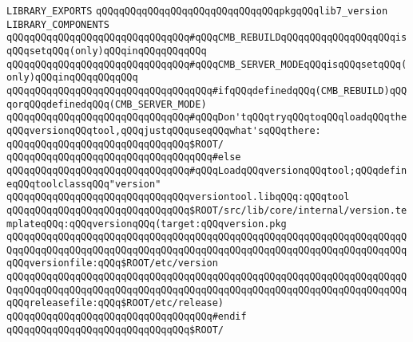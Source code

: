 \verb|LIBRARY_EXPORTS|\newline
\newline
\verb|qQQqqQQqqQQqqQQqqQQqqQQqqQQqqQQqpkgqQQqlib7_version|\newline
\newline
\newline
\newline
\verb|LIBRARY_COMPONENTS|\newline
\newline
\verb|qQQqqQQqqQQqqQQqqQQqqQQqqQQqqQQq#qQQqCMB_REBUILDqQQqqQQqqQQqqQQqqQQqisqQQqsetqQQq(only)qQQqinqQQqqQQqqQQq|\newline
\verb|qQQqqQQqqQQqqQQqqQQqqQQqqQQqqQQq#qQQqCMB_SERVER_MODEqQQqisqQQqsetqQQq(only)qQQqinqQQqqQQqqQQq|\newline
\newline
\verb|qQQqqQQqqQQqqQQqqQQqqQQqqQQqqQQqqQQq#ifqQQqdefinedqQQq(CMB_REBUILD)qQQqorqQQqdefinedqQQq(CMB_SERVER_MODE)|\newline
\newline
\verb|qQQqqQQqqQQqqQQqqQQqqQQqqQQqqQQq#qQQqDon'tqQQqtryqQQqtoqQQqloadqQQqtheqQQqversionqQQqtool,qQQqjustqQQquseqQQqwhat'sqQQqthere:|\newline
\verb|qQQqqQQqqQQqqQQqqQQqqQQqqQQqqQQq$ROOT/|\newline
\newline
\verb|qQQqqQQqqQQqqQQqqQQqqQQqqQQqqQQqqQQq#else|\newline
\newline
\verb|qQQqqQQqqQQqqQQqqQQqqQQqqQQqqQQq#qQQqLoadqQQqversionqQQqtool;qQQqdefineqQQqtoolclassqQQq"version"|\newline
\verb|qQQqqQQqqQQqqQQqqQQqqQQqqQQqqQQqversiontool.libqQQq:qQQqtool|\newline
\newline
\verb|qQQqqQQqqQQqqQQqqQQqqQQqqQQqqQQq$ROOT/src/lib/core/internal/version.templateqQQq:qQQqversionqQQq(target:qQQqversion.pkg|\newline
\verb|qQQqqQQqqQQqqQQqqQQqqQQqqQQqqQQqqQQqqQQqqQQqqQQqqQQqqQQqqQQqqQQqqQQqqQQqqQQqqQQqqQQqqQQqqQQqqQQqqQQqqQQqqQQqqQQqqQQqqQQqqQQqqQQqqQQqqQQqqQQqqQQqversionfile:qQQq$ROOT/etc/version|\newline
\verb|qQQqqQQqqQQqqQQqqQQqqQQqqQQqqQQqqQQqqQQqqQQqqQQqqQQqqQQqqQQqqQQqqQQqqQQqqQQqqQQqqQQqqQQqqQQqqQQqqQQqqQQqqQQqqQQqqQQqqQQqqQQqqQQqqQQqqQQqqQQqqQQqreleasefile:qQQq$ROOT/etc/release)|\newline
\newline
\verb|qQQqqQQqqQQqqQQqqQQqqQQqqQQqqQQqqQQq#endif|\newline
\newline
\verb|qQQqqQQqqQQqqQQqqQQqqQQqqQQqqQQq$ROOT/|\newline

